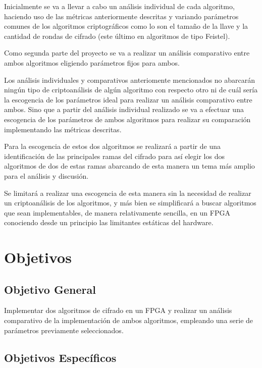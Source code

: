 Inicialmente se va a llevar a cabo un análisis individual de cada algoritmo, haciendo uso de las métricas anteriormente descritas y variando parámetros comunes de los algoritmos criptográficos como lo son el tamaño de la llave y la cantidad de rondas de cifrado (este último en algoritmos de tipo Feistel). 

Como segunda parte del proyecto se va a realizar un análisis comparativo entre ambos algoritmos eligiendo parámetros fijos para ambos.

Los análisis individuales y comparativos anteriomente mencionados no abarcarán ningún tipo de criptoanálisis de algún algoritmo con respecto otro ni de cuál sería la escogencia de los parámetros ideal para realizar un análisis comparativo entre ambos. Sino que a partir del análisis individual realizado se va a efectuar una escogencia de los parámetros de ambos algoritmos para realizar su comparación implementando las métricas descritas.

Para la escogencia de estos dos algoritmos se realizará a partir de una identificación de las principales ramas del cifrado para así elegir los dos algoritmos de dos de estas ramas abarcando de esta manera un tema más amplio para el análisis y discusión.

Se limitará a realizar una escogencia de esta manera sin la necesidad de realizar un criptoanálisis de los algoritmos, y más bien se simplificará a buscar algoritmos que sean implementables, de manera relativamente sencilla, en un FPGA conociendo desde un principio las limitantes estáticas del hardware.


\section{Objetivos}

\subsection{Objetivo General}

Implementar dos algoritmos de cifrado en un FPGA y realizar un análisis comparativo de la implementación de ambos algoritmos, empleando una serie de parámetros previamente seleccionados.


\subsection{Objetivos Específicos}

